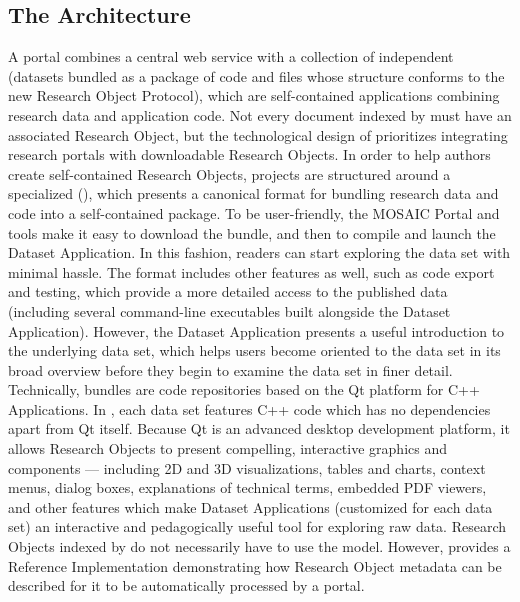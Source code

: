\documentclass[11pt,letterpaper]{article}
\begin{document}
\subsection{The {\lMOSAIC} Architecture}
A {\MOSAIC} portal combines a central web service with a 
collection of independent  
(datasets bundled as a package of code and files 
whose structure conforms to the new Research Object Protocol), 
which are self-contained applications combining 
research data and application code.  Not every 
document indexed by {\MOSAIC} must have an associated 
Research Object, but the technological design of 
{\MOSAIC} prioritizes integrating research portals 
with downloadable Research Objects.
\p{}
In order to help authors create self-contained 
Research Objects, {\MOSAIC} projects are structured 
around a specialized 
 ({\RAK}), 
which presents a canonical format for bundling 
research data and code into a self-contained 
package.  To be user-friendly, the MOSAIC Portal 
and tools make it easy 
to download the {\RAK} bundle, and 
then to compile and launch the Dataset Application.  
In this fashion, readers can start exploring the data 
set with minimal hassle.  
\p{}
The {\RAK} format includes other 
features as well, such as code export and testing, 
which provide a more detailed access to 
the published data (including several command-line 
executables built alongside the Dataset Application).  
However, the Dataset Application 
presents a useful introduction to the underlying 
data set, which helps users become oriented to the data set 
in its broad overview before they begin to 
examine the data set in finer detail.
\p{}
Technically, {\MOSAIC} {\RAK} bundles are code repositories 
based on the Qt platform for C++ Applications.  
In {\RAK}, each data set features C++ code which has no 
dependencies apart from Qt itself.  Because Qt is an advanced 
desktop {\GUI} development platform, it allows 
Research Objects to present compelling, 
interactive graphics and {\GUI} components 
--- including 2D and 3D visualizations, tables and charts, 
context menus, dialog boxes, explanations of 
technical terms, embedded PDF viewers, and other 
features which make Dataset Applications 
(customized for each data set) an 
interactive and pedagogically useful tool for 
exploring raw data.
\p{}  
Research Objects indexed by {\MOSAIC} do not necessarily have 
to use the {\RAK} model.  However, {\RAK} provides a 
Reference Implementation demonstrating how Research Object 
metadata can be described for it to be automatically 
processed by a {\MOSAIC} portal.
\end{document}
